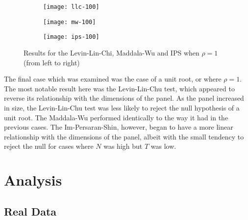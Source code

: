 \begin{figure}[htp]
	\centering
	\begin{subfigure}{0.3\textwidth}
		\centering
		\texttt{[image: llc-100]}
	\end{subfigure}
	\begin{subfigure}{0.3\textwidth}
		\centering
		\texttt{[image: mw-100]}
	\end{subfigure}
	\begin{subfigure}{0.3\textwidth}
		\centering
		\texttt{[image: ips-100]}
	\end{subfigure}
	\caption{Results for the Levin-Lin-Chi, Maddala-Wu and IPS when $\rho = 1$ (from left to right)}
\end{figure}

The final case which was examined was the case of a unit root, or where $\rho = 1$. The most notable result here was the Levin-Lin-Chu test, which appeared to reverse its relationship with the dimensions of the panel. As the panel increased in size, the Levin-Lin-Chu test was less likely to reject the null hypothesis of a unit root. The Maddala-Wu performed identically to the way it had in the previous cases. The Im-Persaran-Shin, however, began to have a more linear relationship with the dimensions of the panel, albeit with the small tendency to reject the null for cases where $N$ was high but $T$ was low.

\section{Analysis}

\subsection{Real Data}

